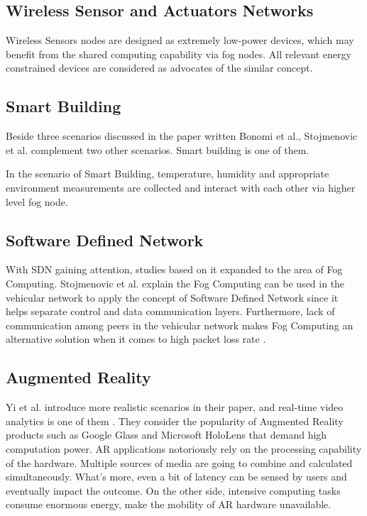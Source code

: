 \subsection{Wireless Sensor and Actuators Networks}
Wireless Sensors nodes are designed as extremely low-power devices, which may benefit from the shared computing capability via fog nodes. All relevant energy constrained devices are considered as advocates of the similar concept.

\subsection{Smart Building}
Beside three scenarios discussed in the paper written Bonomi et al., Stojmenovic et al. complement two other scenarios. Smart building is one of them.

In the scenario of Smart Building, temperature, humidity and appropriate environment measurements are collected and interact with each other via higher level fog node\cite{stojmenovic2014fog}.

\subsection{Software Defined Network}
With SDN gaining attention, studies based on it expanded to the area of Fog Computing. Stojmenovic et al. explain the Fog Computing can be used in the vehicular network to apply the concept of Software Defined Network since it helps separate control and data communication layers. Furthermore, lack of communication among peers in the vehicular network makes Fog Computing an alternative solution when it comes to high packet loss rate \cite{stojmenovic2014fog}.

\subsection{Augmented Reality}
Yi et al. introduce more realistic scenarios in their paper, and real-time video analytics is one of them \cite{yi2015survey}. They consider the popularity of Augmented Reality products such as Google Glass and Microsoft HoloLens that demand high computation power. AR applications notoriously rely on the processing capability of the hardware. Multiple sources of media are going to combine and calculated simultaneously. What's more, even a bit of latency can be sensed by users and eventually impact the outcome. On the other side, intensive computing tasks consume enormous energy, make the mobility of AR hardware unavailable. 


